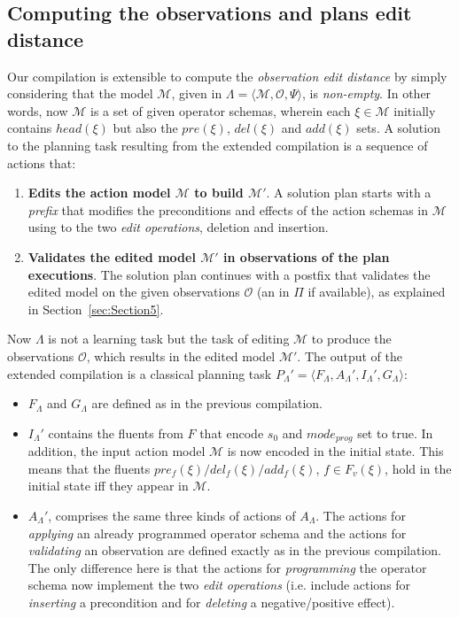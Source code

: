 \documentclass[3p,times]{elsarticle}
\newcommand{\tup}[1]{{\langle #1 \rangle}}
\begin{document}
\subsection{Computing the observations and plans edit distance}
Our compilation is extensible to compute the {\em observation edit distance} by simply considering that the model $\mathcal{M}$, given in $\Lambda=\tup{\mathcal{M},\mathcal{O},\Psi}$, is {\em non-empty}. In other words, now $\mathcal{M}$ is a set of given operator schemas, wherein each $\xi\in\mathcal{M}$ initially contains $head(\xi)$ but also the $pre(\xi)$, $del(\xi)$ and $add(\xi)$ sets. A solution to the planning task resulting from the extended compilation is a sequence of actions that:

\begin{enumerate}
\item {\bf Edits the action model $\mathcal{M}$ to build $\mathcal{M}'$}. A solution plan starts with a {\em prefix} that modifies the preconditions and effects of the action schemas in $\mathcal{M}$ using to the two {\em edit operations}, deletion and insertion.
\item {\bf Validates the edited model $\mathcal{M}'$ in observations of the plan executions}. The solution plan continues with a postfix that validates the edited model on the given observations $\mathcal{O}$ (an in $\Pi$ if available), as explained in Section~\ref{sec:Section5}.
\end{enumerate}

Now $\Lambda$ is not a learning task but the task of editing $\mathcal{M}$ to produce the observations $\mathcal{O}$, which results in the edited model $\mathcal{M}'$. The output of the extended compilation is a classical planning task $P_{\Lambda}'=\tup{F_{\Lambda},A_{\Lambda}',I_{\Lambda}',G_{\Lambda}}$:

\begin{itemize}
\item $F_{\Lambda}$ and $G_{\Lambda}$ are defined as in the previous compilation.
\item $I_{\Lambda}'$ contains the fluents from $F$ that encode $s_0$ and $mode_{prog}$ set to true. In addition, the input action model $\mathcal{M}$ is now encoded in the initial state. This means that the fluents $pre_f(\xi)/del_f(\xi)/add_f(\xi)$, $f\in F_v(\xi)$, hold in the initial state iff they appear in $\mathcal{M}$.
\item $A_{\Lambda}'$, comprises the same three kinds of actions of $A_{\Lambda}$. The actions for {\em applying} an already programmed operator schema and the actions for {\em validating} an observation are defined exactly as in the previous compilation. The only difference here is that the actions for {\em programming} the operator schema now implement the two {\em edit operations} (i.e. include actions for {\em inserting} a precondition and for {\em deleting} a negative/positive effect).
\end{itemize}
\end{document}

